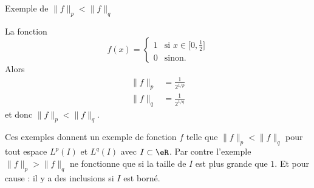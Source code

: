 \begin{subproof}
	\item[Exemple de \( \| f \|_p<\| f \|_q\)]

	La fonction
	\begin{equation}
		f(x)=\begin{cases}
			1 & \text{si } x\in\mathopen[ 0 , \frac{ 1 }{2} \mathclose] \\
			0 & \text{sinon.}
		\end{cases}
	\end{equation}
	Alors
	\begin{subequations}
		\begin{align}
			\| f \|_p & =\frac{1}{ 2^{1/p} } \\
			\| f \|_q & =\frac{1}{ 2^{1/q} }
		\end{align}
	\end{subequations}
	et donc \( \| f \|_p<\| f \|_q\).
\end{subproof}

Ces exemples donnent un exemple de fonction \( f\) telle que \( \| f \|_p<\| f \|_q\) pour tout espace \( L^p(I)\) et \( L^q(I)\) avec \( I\subset \eR\). Par contre l'exemple \( \| f \|_p>\| f \|_q\) ne fonctionne que si la taille de \( I\) est plus grande que \( 1\). Et pour cause : il y a des inclusions si \( I\) est borné.

